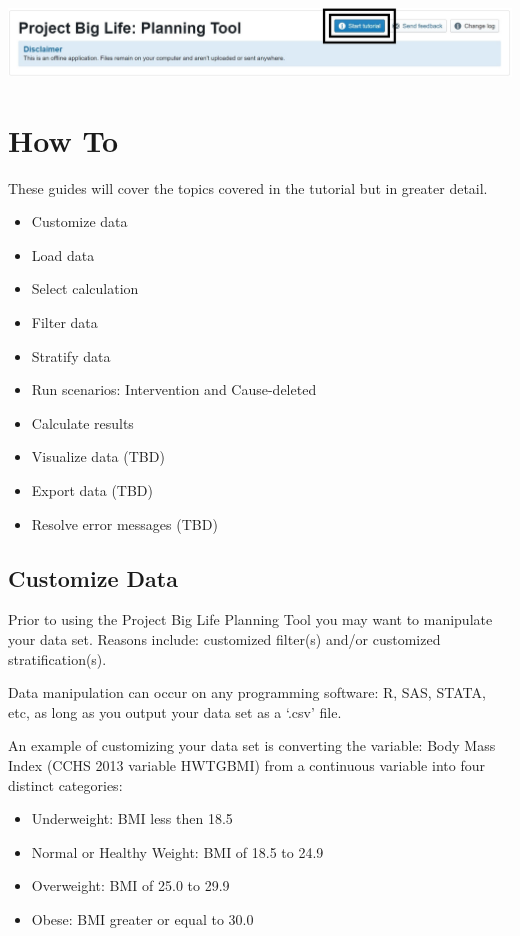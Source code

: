 \documentclass[]{book}
\providecommand{\tightlist}{%
  \setlength{\itemsep}{0pt}\setlength{\parskip}{0pt}}
\begin{document}
\begin{center}\includegraphics{Tutorial Button} \end{center}

\chapter{How To}\label{howto}

These guides will cover the topics covered in the tutorial but in
greater detail.

\begin{itemize}
\tightlist
\item
  Customize data
\item
  Load data
\item
  Select calculation
\item
  Filter data
\item
  Stratify data
\item
  Run scenarios: Intervention and Cause-deleted
\item
  Calculate results
\item
  Visualize data (TBD)
\item
  Export data (TBD)
\item
  Resolve error messages (TBD)
\end{itemize}

\section{Customize Data}\label{customize-data}

Prior to using the Project Big Life Planning Tool you may want to
manipulate your data set. Reasons include: customized filter(s) and/or
customized stratification(s).

Data manipulation can occur on any programming software: R, SAS, STATA,
etc, as long as you output your data set as a `.csv' file.

An example of customizing your data set is converting the variable: Body
Mass Index (CCHS 2013 variable HWTGBMI) from a continuous variable into
four distinct categories:

\begin{itemize}
\tightlist
\item
  Underweight: BMI less then 18.5
\item
  Normal or Healthy Weight: BMI of 18.5 to 24.9
\item
  Overweight: BMI of 25.0 to 29.9
\item
  Obese: BMI greater or equal to 30.0
\end{itemize}
\end{document}
